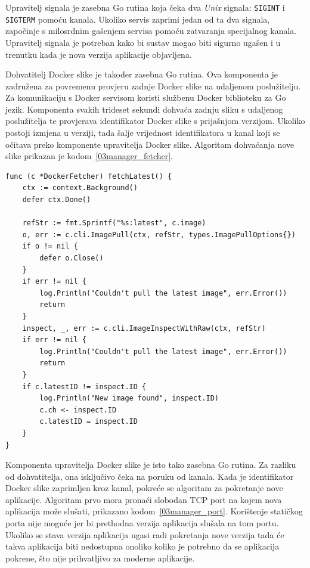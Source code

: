 Upravitelj signala je zasebna Go rutina koja čeka dva \textit{Unix} signala: \texttt{SIGINT} i
\texttt{SIGTERM} pomoću kanala. Ukoliko servis zaprimi jedan od ta dva signala, započinje s
milosrdnim gašenjem servisa pomoću zatvaranja specijalnog kanala. Upravitelj signala je potreban
kako bi sustav mogao biti sigurno ugašen i u trenutku kada je nova verzija aplikacije objavljena.

Dohvatitelj Docker slike je također zasebna Go rutina. Ova komponenta je zadružena za povremenu
provjeru zadnje Docker slike na udaljenom poslužitelju. Za komunikaciju s Docker servisom koristi
službenu Docker biblioteku za Go jezik. Komponenta svakih trideset sekundi dohvaća zadnju sliku s
udaljenog poslužitelja te provjerava identifikator Docker slike s prijašnjom verzijom. Ukoliko
postoji izmjena u verziji, tada šalje vrijednost identifikatora u kanal koji se očitava preko
komponente upravitelja Docker slike. Algoritam dohvaćanja nove slike prikazan je
kodom~\ref{03manager_fetcher}.

\begin{lstlisting}[float=h]
func (c *DockerFetcher) fetchLatest() {
	ctx := context.Background()
	defer ctx.Done()

	refStr := fmt.Sprintf("%s:latest", c.image)
	o, err := c.cli.ImagePull(ctx, refStr, types.ImagePullOptions{})
	if o != nil {
		defer o.Close()
	}
	if err != nil {
		log.Println("Couldn't pull the latest image", err.Error())
		return
	}
	inspect, _, err := c.cli.ImageInspectWithRaw(ctx, refStr)
	if err != nil {
		log.Println("Couldn't pull the latest image", err.Error())
		return
	}
	if c.latestID != inspect.ID {
		log.Println("New image found", inspect.ID)
		c.ch <- inspect.ID
		c.latestID = inspect.ID
	}
}
\end{lstlisting}

Komponenta upravitelja Docker slike je isto tako zasebna Go rutina. Za razliku od dohvatitelja, ona
isključivo čeka na poruku od kanala. Kada je identifikator Docker slike zaprimljen kroz kanal,
pokreće se algoritam za pokretanje nove aplikacije. Algoritam prvo mora pronaći slobodan TCP port na
kojem nova aplikacija može slušati, prikazano kodom~\ref{03manager_port}. Korištenje statičkog porta
nije moguće jer bi prethodna verzija aplikacija slušala na tom portu. Ukoliko se stava verzija
aplikacija ugasi radi pokretanja nove verzija tada će takva aplikacija biti nedostupna onoliko
koliko je potrebno da se aplikacija pokrene, što nije prihvatljivo za moderne aplikacije.

